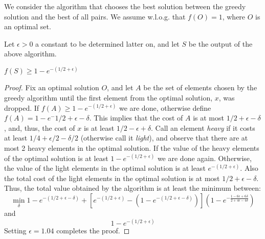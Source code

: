 We consider the algorithm that chooses the best solution between the greedy
solution and the best of all pairs.
We assume w.l.o.g. that $f(O) = 1$, where $O$ is an optimal set.

Let $\epsilon > 0$ a constant to be determined latter on, and let $S$ be the output of 
the above algorithm.
\begin{theorem}
$f(S) \geq 1 - e^{-(1/2 + \epsilon)}$
\end{theorem}

\begin{proof}
Fix an optimal solution $O$, 
and let $A$ be the set of elements chosen by the greedy algorithm 
until the first element from the optimal solution, $x$, was dropped. 
If $f(A) \geq 1 - e^{-(1/2 + \epsilon)}$ we are done, otherwise define 
$f(A) = 1 - e^-{1/2 + \epsilon - \delta}$. 
This implies that the cost of $A$ is at most $1/2 + \epsilon - \delta$, and, thus, the 
cost of $x$ is at least $1/2 - \epsilon + \delta$.
Call an element \emph{heavy} if it costs at least $1/4 + \epsilon/2 - \delta/2$
(otherwise call it \emph{light}), 
and observe that there are at most 2 heavy elements in the optimal solution.
If the value of the heavy elements of the optimal solution 
is at least $1-e^{-(1/2 + \epsilon)}$ we are done again. 
Otherwise, the value of the light elements in the optimal solution 
is at least $e^{-(1/2 + \epsilon)}$.
Also the total cost of the light elements in the optimal solution 
is at most $1/2 + \epsilon - \delta$.
Thus, the total value obtained by the algorithm is at least the minimum between:
$$
\min_\delta
1-e^{-(1/2 + \epsilon - \delta)}
+
\left[
e^{-(1/2 + \epsilon)}
-
(1-e^{-(1/2 + \epsilon - \delta)})
\right]
(1-e^{-\frac{1-6\epsilon + 6\delta}{2 + 4\epsilon - 4\delta}})
$$ 
and
$$
1-e^{-(1/2 + \epsilon)}
$$
Setting $\epsilon = 1.04$ completes the proof. 
\end{proof}
